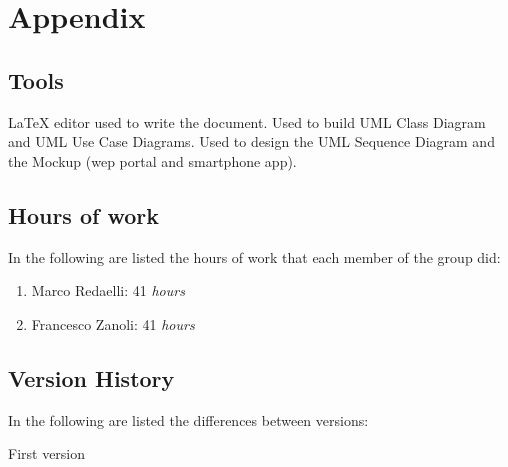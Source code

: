 \documentclass{../Common/Structure/doc_pdf}
\begin{document}
\appendix
\chapter{Appendix}

\section{Tools}
\begin{itemize}
	 \LaTeX{} editor used to write the document.
	 Used to build UML Class Diagram and UML Use Case Diagrams.
	 Used to design the UML Sequence Diagram and the Mockup (wep portal and smartphone app).
\end{itemize}
\newpage
\section{Hours of work}
In the following are listed the hours of work that each member of the group did:
\begin{enumerate}
	\item Marco Redaelli: 41 \emph{hours}
	\item Francesco Zanoli: 41 \emph{hours}
\end{enumerate}
\newpage
\section{Version History}
In the following are listed the differences between versions:
\begin{enumerate}
	 First version
\end{enumerate}
\end{document}
